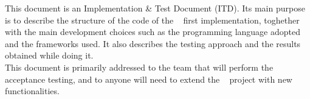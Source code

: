 This document is an Implementation \& Test Document (ITD). Its main purpose is to describe the structure of the code of the \projectname~ first implementation, toghether with the main development choices such as the programming language adopted and the frameworks used. It also describes the testing approach and the results obtained while doing it. \\
This document is primarily addressed to the team that will perform the acceptance testing, and to anyone will need to extend the \projectname~ project with new functionalities.